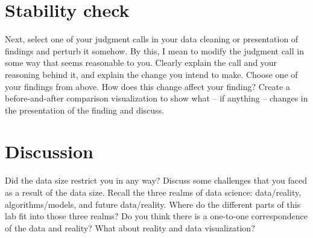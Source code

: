 \documentclass[10pt,letterpaper]{article}
\begin{document}
\section*{Stability check}

Next, select one of your judgment calls in your data cleaning or presentation of findings and perturb it somehow. By this, I mean to modify the judgment call in some way that seems reasonable to you. Clearly explain the call and your reasoning behind it, and explain the change you intend to make. Choose one of your findings from above. How does this change affect your finding? Create a before-and-after comparison visualization to show what – if anything – changes in the presentation of the finding and discuss.

\section*{Discussion}

Did the data size restrict you in any way? Discuss some challenges that you faced as a result of the data size. Recall the three realms of data science: data/reality, algorithms/models, and future data/reality. Where do the different parts of this lab fit into those three realms? Do you think there is a one-to-one correspondence of the data and reality? What about reality and data visualization?
\end{document}

